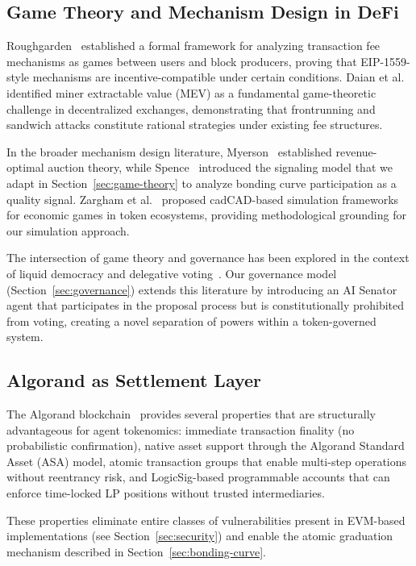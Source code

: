 \subsection{Game Theory and Mechanism Design in DeFi}
\label{subsec:rw-game-theory}

Roughgarden~\citep{roughgarden2020transaction} established a formal framework
for analyzing transaction fee mechanisms as games between users and block
producers, proving that EIP-1559-style mechanisms are incentive-compatible
under certain conditions. Daian et al.~\citep{daian2020flash} identified
miner extractable value (MEV) as a fundamental game-theoretic challenge in
decentralized exchanges, demonstrating that frontrunning and sandwich attacks
constitute rational strategies under existing fee structures.

In the broader mechanism design literature,
Myerson~\citep{myerson1981optimal} established revenue-optimal auction theory,
while Spence~\citep{spence1973job} introduced the signaling model that we
adapt in Section~\ref{sec:game-theory} to analyze bonding curve participation
as a quality signal. Zargham et al.~\citep{zargham2020} proposed cadCAD-based
simulation frameworks for economic games in token ecosystems, providing
methodological grounding for our simulation approach.

The intersection of game theory and governance has been explored in the context
of liquid democracy and delegative voting~\citep{fudenberg1991game}. Our
governance model (Section~\ref{sec:governance}) extends this literature by
introducing an AI Senator agent that participates in the proposal process but
is constitutionally prohibited from voting, creating a novel separation of
powers within a token-governed system.

\subsection{Algorand as Settlement Layer}
\label{subsec:rw-algorand}

The Algorand blockchain~\citep{algorand2019, chen2019algorand} provides
several properties that are structurally advantageous for agent tokenomics:
immediate transaction finality (no probabilistic confirmation), native asset
support through the Algorand Standard Asset (ASA) model, atomic transaction
groups that enable multi-step operations without reentrancy risk, and
LogicSig-based programmable accounts that can enforce time-locked LP
positions without trusted intermediaries.

These properties eliminate entire classes of vulnerabilities present in
EVM-based implementations (see Section~\ref{sec:security}) and enable the
atomic graduation mechanism described in Section~\ref{sec:bonding-curve}.
